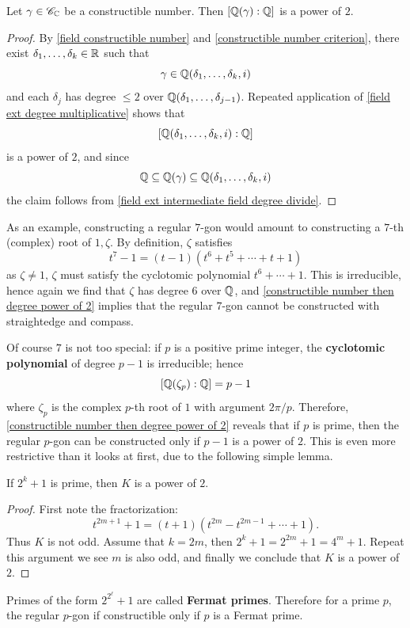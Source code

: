\begin{corollary}\label{constructible number then degree power of 2}
Let $\gamma\in\mathscr{C}_{\mathbb{C}}$ be a constructible number. Then $[\mathbb{Q}(\gamma):\mathbb{Q}]$ is a power of $2$.
\end{corollary}
\begin{proof}
By \cref{field constructible number} and \cref{constructible number criterion}, there exist $\delta_1,\dots,\delta_k\in\mathbb{R}$ such that
\[\gamma\in\mathbb{Q}(\delta_1,\dots,\delta_k,i)\]
and each $\delta_j$ has degree $\leq 2$ over $\mathbb{Q}(\delta_1,\dots,\delta_{j-1})$. Repeated application of \cref{field ext degree multiplicative} shows that
\[[\mathbb{Q}(\delta_1,\dots,\delta_k,i):\mathbb{Q}]\]
is a power of $2$, and since
\[\mathbb{Q}\subseteq\mathbb{Q}(\gamma)\subseteq\mathbb{Q}(\delta_1,\dots,\delta_k,i)\]
the claim follows from \cref{field ext intermediate field degree divide}.
\end{proof}
As an example, constructing a regular $7$-gon would amount to constructing a $7$-th (complex) root of $1,\zeta$. By definition, $\zeta$ satisfies
\[t^7-1=(t-1)(t^6+t^5+\cdots+t+1)\]
as $\zeta\neq 1$, $\zeta$ must satisfy the cyclotomic polynomial $t^6+\cdots+1$. This is irreducible, hence again we find that $\zeta$ has degree $6$ over $\mathbb{Q}$, and \cref{constructible number then degree power of 2} implies that the regular $7$-gon cannot be constructed with straightedge and compass.\par
Of course $7$ is not too special: if $p$ is a positive prime integer, the \textbf{cyclotomic polynomial} of degree $p-1$ is irreducible; hence
\[[\mathbb{Q}(\zeta_p):\mathbb{Q}]=p-1\]
where $\zeta_p$ is the complex $p$-th root of $1$ with argument $2\pi/p$. Therefore, \cref{constructible number then degree power of 2} reveals that if $p$ is prime, then the regular $p$-gon can be constructed only if $p-1$ is a power of $2$. This is even more restrictive than it looks at first, due to the following simple lemma.
\begin{lemma}
If $2^k+1$ is prime, then $K$ is a power of $2$.
\end{lemma}
\begin{proof}
First note the fractorization:
\[t^{2m+1}+1=(t+1)(t^{2m}-t^{2m-1}+\cdots+1).\]
Thus $K$ is not odd. Assume that $k=2m$, then $2^k+1=2^{2m}+1=4^m+1$. Repeat this argument we see $m$ is also odd, and finally we conclude that $K$ is a power of $2$.
\end{proof}
Primes of the form $2^{2^\ell}+1$ are called \textbf{Fermat primes}. Therefore for a prime $p$, the regular $p$-gon if constructible only if $p$ is a Fermat prime.\par
